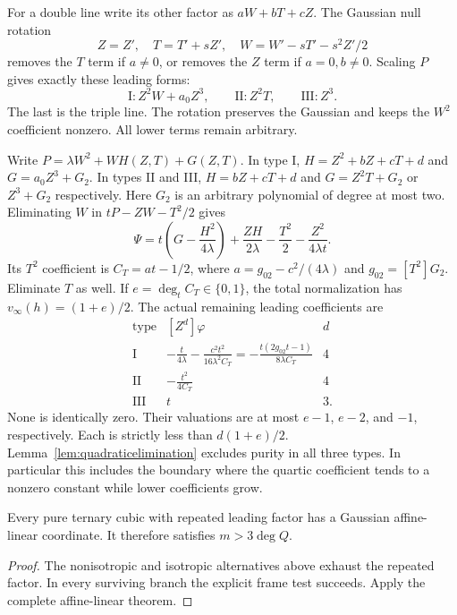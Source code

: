 For a double line write its other factor as
$aW+bT+cZ$. The Gaussian null rotation
\[
 Z=Z',\quad T=T'+sZ',\quad W=W'-sT'-s^2Z'/2
\]
removes the $T$ term if $a\ne0$, or removes the $Z$ term if
$a=0,b\ne0$. Scaling $P$ gives exactly these leading forms:
\[
 \mathrm I: Z^2W+a_0Z^3,\qquad
 \mathrm {II}:Z^2T,\qquad \mathrm {III}:Z^3.
\]
The last is the triple line. The rotation preserves the Gaussian
and keeps the $W^2$ coefficient nonzero. All lower terms remain
arbitrary.

Write $P=\lambda W^2+W H(Z,T)+G(Z,T)$. In type I,
$H=Z^2+bZ+cT+d$ and $G=a_0Z^3+G_2$. In types II and III,
$H=bZ+cT+d$ and $G=Z^2T+G_2$ or $Z^3+G_2$ respectively.
Here $G_2$ is an arbitrary polynomial of degree at most two.
Eliminating $W$ in $tP-ZW-T^2/2$ gives
\[
 \Psi=t\left(G-\frac{H^2}{4\lambda}\right)
       +\frac{ZH}{2\lambda}-\frac{T^2}{2}
       -\frac{Z^2}{4\lambda t}.
\]
Its $T^2$ coefficient is $C_T=a t-1/2$, where
$a=g_{02}-c^2/(4\lambda)$ and $g_{02}=[T^2]G_2$.
Eliminate $T$ as well. If $e=\deg_t C_T\in\{0,1\}$, the total
normalization has $v_\infty(h)=(1+e)/2$. The actual remaining
leading coefficients are
\[
 \begin{array}{c|c|c}
 \text{type}&[Z^d]\varphi&d\\\hline
 \mathrm I&\displaystyle
  -\frac{t}{4\lambda}-\frac{c^2t^2}{16\lambda^2C_T}
   =-\frac{t(2g_{02}t-1)}{8\lambda C_T}&4\\[5pt]
 \mathrm {II}&\displaystyle-\frac{t^2}{4C_T}&4\\[4pt]
 \mathrm {III}&t&3.
 \end{array}
\]
None is identically zero. Their valuations are at most $e-1$,
$e-2$, and $-1$, respectively. Each is strictly less than
$d(1+e)/2$. Lemma~\ref{lem:quadraticelimination} excludes
purity in all three types. In particular this includes the
boundary where the quartic coefficient tends to a nonzero
constant while lower coefficients grow.

\begin{proposition}\label{prop:repeatedcomplete}
Every pure ternary cubic with repeated leading factor has a
Gaussian affine-linear coordinate. It therefore satisfies
$m>3\deg Q$.
\end{proposition}
\begin{proof}
The nonisotropic and isotropic alternatives above exhaust the
repeated factor. In every surviving branch the explicit frame
test succeeds. Apply the complete affine-linear theorem.
\end{proof}
